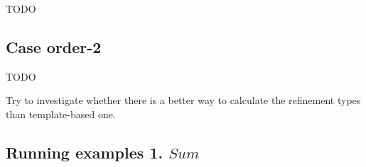\documentclass[runningheads]{llncs}
\newcommand\COL{\mathbin{:}}
\newcommand \true {\textbf{tt}}
\newcommand \stypeint {\textbf{Int}}
\newcommand \stypebool {\bullet}
\newcommand \constraint {\theta}
\newcommand \typeint[1]{{#1} : \stypeint}
\newcommand \typebool[1]{\stypebool \langle #1 \rangle}
\newcommand \minimalize[1] {#1_{\Downarrow}}
\newcommand {\intersect} {\land}
\begin{document}
TODO

\subsection{Case order-2}

TODO

Try to investigate whether there is a better way to calculate the refinement types than template-based one.

%
%
%

\subsection{Running examples 1. \( Sum \)}
\end{document}
